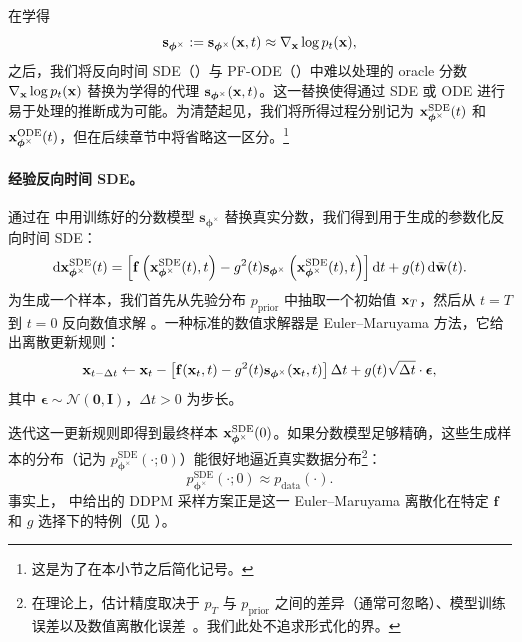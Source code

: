 在学得
\[
\mathbf{s}_{\bm{\phi}^\times} := \mathbf{s}_{\bm{\phi}^\times}({\mathbf{x}}, t) \approx \nabla_{{\mathbf{x}}} \log p_t({\mathbf{x}}),
\]
之后，我们将反向时间 SDE（）与 PF-ODE（）中难以处理的 oracle 分数 $\nabla_{{\mathbf{x}}} \log p_t({\mathbf{x}})$ 替换为学得的代理 $\mathbf{s}_{\bm{\phi}^\times}({\mathbf{x}}, t)$。这一替换使得通过 SDE 或 ODE 进行易于处理的推断成为可能。为清楚起见，我们将所得过程分别记为 ${\mathbf{x}}^{\mathrm{SDE}}_{\bm{\phi}^\times}(t)$ 和 ${\mathbf{x}}^{\mathrm{ODE}}_{\bm{\phi}^\times}(t)$，但在后续章节中将省略这一区分。\footnote{这是为了在本小节之后简化记号。}

\paragraph{经验反向时间 SDE。}
通过在  中用训练好的分数模型 $\mathbf{s}_{\bm{\phi}^\times}$ 替换真实分数，我们得到用于生成的参数化反向时间 SDE：
\begin{equation}\label{eq:sde_backward_sub}
    \mathop{}\!\mathrm{d} {\mathbf{x}}^{\mathrm{SDE}}_{\bm{\phi}^\times}(t) = \left[\mathbf{f}\left({\mathbf{x}}^{\mathrm{SDE}}_{\bm{\phi}^\times}(t), t\right) - g^2(t) \mathbf{s}_{\bm{\phi}^\times}\left({\mathbf{x}}^{\mathrm{SDE}}_{\bm{\phi}^\times}(t), t\right) \right] \mathop{}\!\mathrm{d} t + g(t) \mathop{}\!\mathrm{d} \bar{{\mathbf{w}}}(t).
\end{equation}
为生成一个样本，我们首先从先验分布 $p_{\mathrm{prior}}$ 中抽取一个初始值 ${\mathbf{x}}_T$，然后从 $t=T$ 到 $t=0$ 反向数值求解 。一种标准的数值求解器是 Euler–Maruyama 方法，它给出离散更新规则：
\begin{equation}\label{eq:euler-maruyama}
{\mathbf{x}}_{t - \Delta t} \leftarrow {\mathbf{x}}_t - \left[ \mathbf{f}({\mathbf{x}}_t, t) - g^2(t)  \mathbf{s}_{\bm{\phi}^\times}({\mathbf{x}}_t, t) \right] \Delta t + g(t) \sqrt{\Delta t} \cdot \boldsymbol{\epsilon},
\end{equation}
其中 $\boldsymbol{\epsilon} \sim \mathcal{N}(\bm{0}, \mathbf{I})$，$\Delta t > 0$ 为步长。

迭代这一更新规则即得到最终样本 ${\mathbf{x}}^{\mathrm{SDE}}_{\bm{\phi}^\times}(0)$。如果分数模型足够精确，这些生成样本的分布（记为 $p_{\bm{\phi}^\times}^{\mathrm{SDE}}(\cdot; 0)$）能很好地逼近真实数据分布\footnote{在理论上，估计精度取决于 $p_T$ 与 $p_{\mathrm{prior}}$ 之间的差异（通常可忽略）、模型训练误差以及数值离散化误差~\citep{de2022convergence,wang2024evaluating}。我们此处不追求形式化的界。}：
\[
p_{\bm{\phi}^\times}^{\mathrm{SDE}}(\cdot; 0) \approx p_{\mathrm{data}}(\cdot).
\]
事实上， 中给出的 DDPM 采样方案正是这一 Euler–Maruyama 离散化在特定 $\mathbf{f}$ 和 $g$ 选择下的特例（见 ）。


